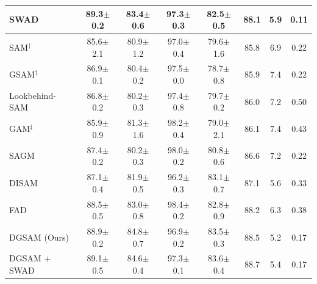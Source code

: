 \documentclass{article}
\theoremstyle{plain}
\theoremstyle{definition}
\theoremstyle{remark}
\begin{document}
\begin{table}[!ht]
\begin{tabular}{l|cccc|ccc}
SWAD \cite{cha2021swad}         & {89.3\scriptsize$\pm$0.2} & {83.4\scriptsize$\pm$0.6} & {97.3\scriptsize$\pm$0.3} & {82.5\scriptsize$\pm$0.5} & 88.1 & 5.9  & 0.11 \\ \midrule
SAM\(^\dag\) \cite{foret2021sam}         & {85.6\scriptsize$\pm$2.1} & {80.9\scriptsize$\pm$1.2} & {97.0\scriptsize$\pm$0.4} & {79.6\scriptsize$\pm$1.6} & 85.8 & 6.9  & 0.22 \\
GSAM\(^\dag\) \cite{zhuang2022gsam}         & {86.9\scriptsize$\pm$0.1} & {80.4\scriptsize$\pm$0.2} & {97.5\scriptsize$\pm$0.0} & {78.7\scriptsize$\pm$0.8} & 85.9 & 7.4  & 0.22 \\
Lookbehind-SAM \cite{mordido2024lookbehind}         & {86.8\scriptsize$\pm$0.2} & {80.2\scriptsize$\pm$0.3} & {97.4\scriptsize$\pm$0.8} & {79.7\scriptsize$\pm$0.2} & 86.0 & 7.2  & 0.50 \\
GAM\(^\ddag\) \cite{zhang2023gam}         & {85.9\scriptsize$\pm$0.9} & {81.3\scriptsize$\pm$1.6} & {98.2\scriptsize$\pm$0.4} & {79.0\scriptsize$\pm$2.1} & 86.1 & 7.4  & 0.43 \\
SAGM \cite{wang2023sagm}         & {87.4\scriptsize$\pm$0.2} & {80.2\scriptsize$\pm$0.3} & {98.0\scriptsize$\pm$0.2} & {80.8\scriptsize$\pm$0.6} & 86.6 & 7.2  & 0.22 \\
DISAM \cite{zhang2024disam}         & {87.1\scriptsize$\pm$0.4} & {81.9\scriptsize$\pm$0.5} & {96.2\scriptsize$\pm$0.3} & {83.1\scriptsize$\pm$0.7} & 87.1 & 5.6  & 0.33 \\
FAD \cite{zhang2023fad}         & {88.5\scriptsize$\pm$0.5} & {83.0\scriptsize$\pm$0.8} & {98.4\scriptsize$\pm$0.2} & {82.8\scriptsize$\pm$0.9} & 88.2 & 6.3  & 0.38 \\
DGSAM (Ours)         & {88.9\scriptsize$\pm$0.2} & {84.8\scriptsize$\pm$0.7} & {96.9\scriptsize$\pm$0.2} & {83.5\scriptsize$\pm$0.3} & 88.5 & 5.2  & 0.17 \\
DGSAM + SWAD         & {89.1\scriptsize$\pm$0.5} & {84.6\scriptsize$\pm$0.4} & {97.3\scriptsize$\pm$0.1} & {83.6\scriptsize$\pm$0.4} & 88.7 & 5.4  & 0.17 \\\bottomrule
\end{tabular}
\end{table}
\end{document}
